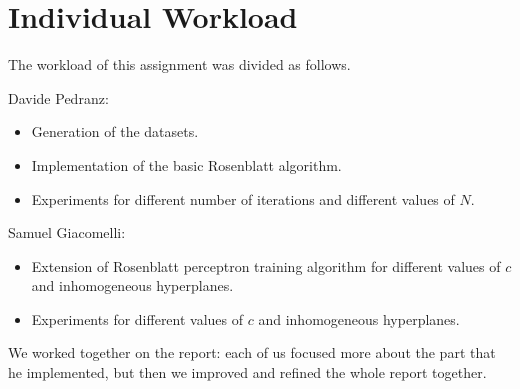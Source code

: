 \section{Individual Workload}
The workload of this assignment was divided as follows.

Davide Pedranz:
\begin{itemize}
    \item Generation of the datasets.
    \item Implementation of the basic Rosenblatt algorithm.
    \item Experiments for different number of iterations and different values of $N$.
\end{itemize}

Samuel Giacomelli:
\begin{itemize}
    \item Extension of Rosenblatt perceptron training algorithm for different values of $c$ and inhomogeneous hyperplanes.
    \item Experiments for different values of $c$ and inhomogeneous hyperplanes.
\end{itemize}

We worked together on the report:
each of us focused more about the part that he implemented, but then we improved and refined the whole report together.
